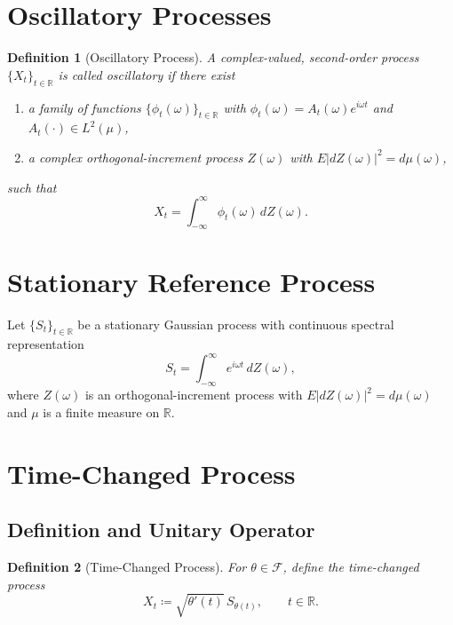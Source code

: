 \documentclass[11pt]{article}
\newtheorem{definition}{Definition}
\begin{document}
\section{Oscillatory Processes}\label{sec:oscillatory}

\begin{definition}[Oscillatory Process]\label{def:oscillatory}
A complex-valued, second-order process $\{X_t\}_{t\in\mathbb{R}}$ is called \emph{oscillatory} if there exist
\begin{enumerate}[label=(\roman*)]
    \item a family of functions $\{\phi_t(\omega)\}_{t\in\mathbb{R}}$ with $\phi_t(\omega)=A_t(\omega)e^{i\omega t}$ and $A_t(\cdot)\in L^2(\mu)$,
    \item a complex orthogonal-increment process $Z(\omega)$ with $E\lvert dZ(\omega)\rvert^2=d\mu(\omega)$,
\end{enumerate}
such that
\begin{equation}\label{eq:oscillatory_rep}
    X_t=\int_{-\infty}^{\infty}\phi_t(\omega)\,dZ(\omega).
\end{equation}
\end{definition}

\section{Stationary Reference Process}\label{sec:stationary}

Let $\{S_t\}_{t\in\mathbb{R}}$ be a stationary Gaussian process with continuous spectral representation
\begin{equation}\label{eq:stationary_rep}
    S_t=\int_{-\infty}^{\infty}e^{i\omega t}\,dZ(\omega),
\end{equation}
where $Z(\omega)$ is an orthogonal-increment process with $E\lvert dZ(\omega)\rvert^2=d\mu(\omega)$ and $\mu$ is a finite measure on $\mathbb{R}$.

\section{Time-Changed Process}\label{sec:time_change}

\subsection{Definition and Unitary Operator}

\begin{definition}[Time-Changed Process]\label{def:time_changed_proc}
For $\theta\in\mathcal{F}$, define the time-changed process
\begin{equation}\label{eq:time_change}
    X_t \coloneqq \sqrt{\theta'(t)}\,S_{\theta(t)}, \qquad t\in\mathbb{R}.
\end{equation}
\end{definition}
\end{document}
